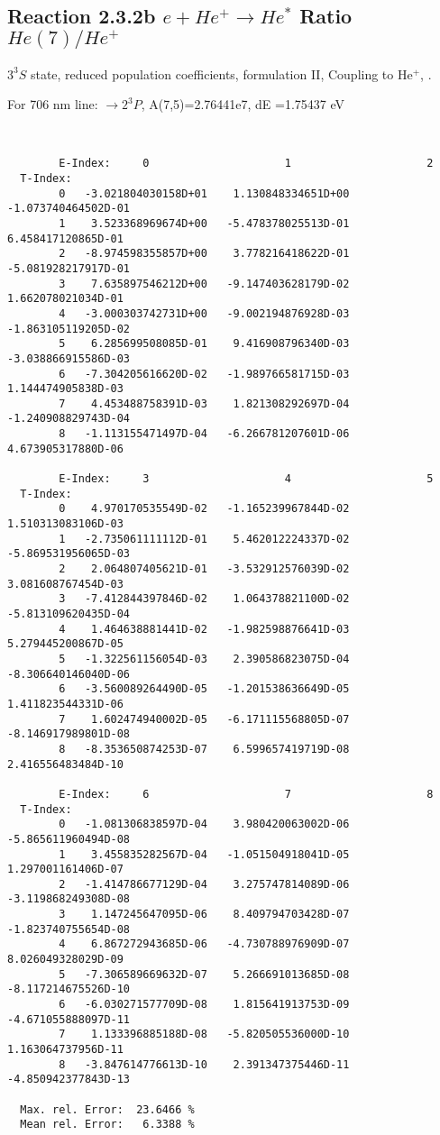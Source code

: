 \documentclass[12pt,dvipdfmx]{article}
\begin{document}
\subsection{
  Reaction 2.3.2b $e + He^+ \rightarrow He^*  $ Ratio $He(7)/He^+$
}

  $3^3S$ state,
  reduced population coefficients, formulation II,
  Coupling to He$^+$, \cite{kn:Fujimoto}.

  For 706 nm line: $\rightarrow 2^3P$, A(7,5)=2.76441e7, dE =1.75437 eV

\begin{small}\begin{verbatim}


        E-Index:     0                     1                     2
  T-Index:
        0   -3.021804030158D+01    1.130848334651D+00   -1.073740464502D-01
        1    3.523368969674D+00   -5.478378025513D-01    6.458417120865D-01
        2   -8.974598355857D+00    3.778216418622D-01   -5.081928217917D-01
        3    7.635897546212D+00   -9.147403628179D-02    1.662078021034D-01
        4   -3.000303742731D+00   -9.002194876928D-03   -1.863105119205D-02
        5    6.285699508085D-01    9.416908796340D-03   -3.038866915586D-03
        6   -7.304205616620D-02   -1.989766581715D-03    1.144474905838D-03
        7    4.453488758391D-03    1.821308292697D-04   -1.240908829743D-04
        8   -1.113155471497D-04   -6.266781207601D-06    4.673905317880D-06

        E-Index:     3                     4                     5
  T-Index:
        0    4.970170535549D-02   -1.165239967844D-02    1.510313083106D-03
        1   -2.735061111112D-01    5.462012224337D-02   -5.869531956065D-03
        2    2.064807405621D-01   -3.532912576039D-02    3.081608767454D-03
        3   -7.412844397846D-02    1.064378821100D-02   -5.813109620435D-04
        4    1.464638881441D-02   -1.982598876641D-03    5.279445200867D-05
        5   -1.322561156054D-03    2.390586823075D-04   -8.306640146040D-06
        6   -3.560089264490D-05   -1.201538636649D-05    1.411823544331D-06
        7    1.602474940002D-05   -6.171115568805D-07   -8.146917989801D-08
        8   -8.353650874253D-07    6.599657419719D-08    2.416556483484D-10

        E-Index:     6                     7                     8
  T-Index:
        0   -1.081306838597D-04    3.980420063002D-06   -5.865611960494D-08
        1    3.455835282567D-04   -1.051504918041D-05    1.297001161406D-07
        2   -1.414786677129D-04    3.275747814089D-06   -3.119868249308D-08
        3    1.147245647095D-06    8.409794703428D-07   -1.823740755654D-08
        4    6.867272943685D-06   -4.730788976909D-07    8.026049328029D-09
        5   -7.306589669632D-07    5.266691013685D-08   -8.117214675526D-10
        6   -6.030271577709D-08    1.815641913753D-09   -4.671055888097D-11
        7    1.133396885188D-08   -5.820505536000D-10    1.163064737956D-11
        8   -3.847614776613D-10    2.391347375446D-11   -4.850942377843D-13

  Max. rel. Error:  23.6466 %
  Mean rel. Error:   6.3388 %


\end{verbatim}\end{small}
\end{document}
